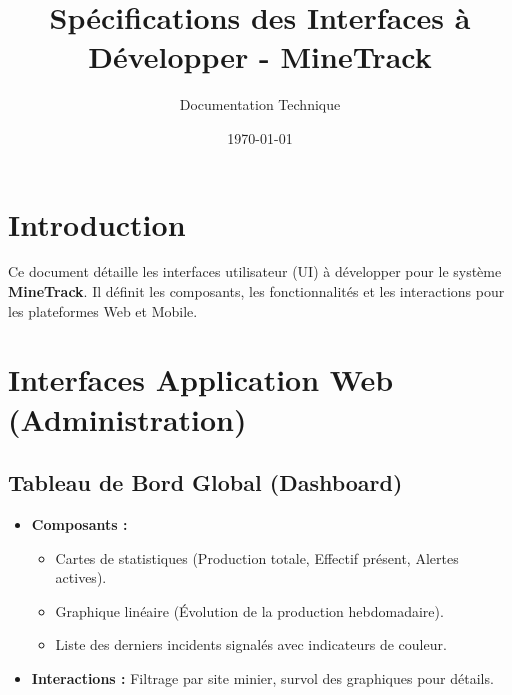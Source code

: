 \documentclass[12pt,a4paper]{article}
\title{\textbf{Spécifications des Interfaces à Développer - MineTrack}}
\author{Documentation Technique}
\date{\today}
\begin{document}
\section{Introduction}
Ce document détaille les interfaces utilisateur (UI) à développer pour le système \textbf{MineTrack}. Il définit les composants, les fonctionnalités et les interactions pour les plateformes Web et Mobile.

\section{Interfaces Application Web (Administration)}

\subsection{Tableau de Bord Global (Dashboard)}
\begin{itemize}[label=\textbullet]
    \item \textbf{Composants :}
    \begin{itemize}
        \item Cartes de statistiques (Production totale, Effectif présent, Alertes actives).
        \item Graphique linéaire (Évolution de la production hebdomadaire).
        \item Liste des derniers incidents signalés avec indicateurs de couleur.
    \end{itemize}
    \item \textbf{Interactions :} Filtrage par site minier, survol des graphiques pour détails.
\end{itemize}
\end{document}
